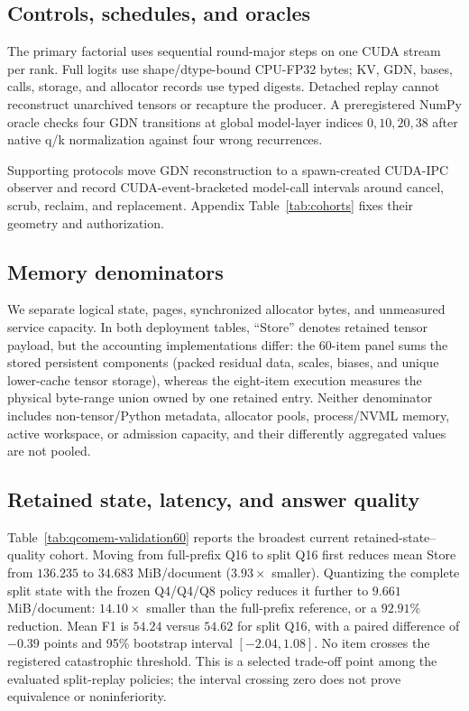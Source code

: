 \documentclass{article}
\begin{document}
\subsection{Controls, schedules, and oracles}

The primary factorial uses sequential round-major steps on one CUDA stream per
rank.  Full logits use shape/dtype-bound CPU-FP32 bytes; KV, GDN, bases, calls,
storage, and allocator records use typed digests.  Detached replay cannot
reconstruct unarchived tensors or recapture the producer.  A preregistered
NumPy oracle checks four GDN transitions at global model-layer indices
$0,10,20,38$ after native q/k normalization against four wrong recurrences.

Supporting protocols move GDN reconstruction to a spawn-created CUDA-IPC
observer and record CUDA-event-bracketed model-call intervals around cancel,
scrub, reclaim, and replacement.  Appendix Table~\ref{tab:cohorts} fixes their
geometry and authorization.

\subsection{Memory denominators}
\label{sec:denominators}

We separate logical state, pages, synchronized allocator bytes, and unmeasured
service capacity.  In both deployment tables, ``Store'' denotes retained tensor
payload, but the accounting implementations differ: the 60-item panel sums the
stored persistent components (packed residual data, scales, biases, and unique
lower-cache tensor storage), whereas the eight-item execution measures the
physical byte-range union owned by one retained entry.  Neither denominator
includes non-tensor/Python metadata, allocator pools, process/NVML memory,
active workspace, or admission capacity, and their differently aggregated
values are not pooled.

\subsection{Retained state, latency, and answer quality}

Table~\ref{tab:qcomem-validation60} reports the broadest current
retained-state--quality cohort.  Moving from full-prefix Q16 to split Q16 first
reduces mean Store from $136.235$ to $34.683$ MiB/document ($3.93\times$
smaller).  Quantizing the complete split state with the frozen Q4/Q4/Q8 policy
reduces it further to $9.661$ MiB/document: $14.10\times$ smaller than the
full-prefix reference, or a $92.91\%$ reduction.  Mean F1 is $54.24$ versus
$54.62$ for split Q16, with a paired difference of $-0.39$ points and 95\%
bootstrap interval $[-2.04,1.08]$.  No item crosses the registered
catastrophic threshold.  This is a selected trade-off point among the evaluated
split-replay policies; the interval crossing zero does not prove equivalence or
noninferiority.
\end{document}
